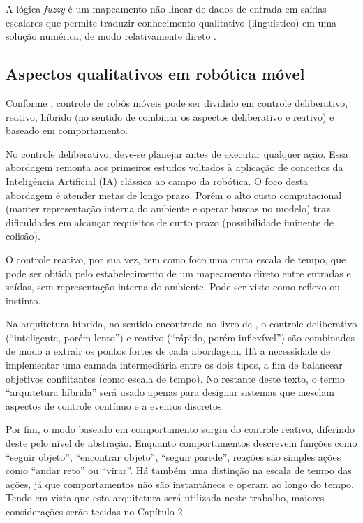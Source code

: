 A lógica \textit{fuzzy} é um mapeamento não linear de dados de entrada em saídas
escalares que permite traduzir conhecimento qualitativo (linguístico) em uma
solução numérica, de modo relativamente direto \cite{Art_Mendel}. 

\subsection{Aspectos qualitativos em robótica móvel}

Conforme , controle de robôs móveis pode ser
dividido em controle deliberativo, reativo, híbrido (no sentido de
combinar os aspectos deliberativo e reativo) e baseado em comportamento.

No controle deliberativo, deve-se planejar antes de executar qualquer
ação. Essa abordagem remonta aos primeiros estudos voltados à aplicação de
conceitos da Inteligência Artificial (IA) clássica ao campo da robótica. O foco
desta abordagem é atender metas de longo prazo. Porém o alto custo computacional (manter representação
interna do ambiente e operar buscas no modelo) traz dificuldades em alcançar
requisitos de curto prazo (possibilidade iminente de colisão).

O controle reativo, por sua vez, tem como foco uma curta escala de tempo, que
pode ser obtida pelo estabelecimento de um mapeamento direto entre entradas e
saídas, sem representação interna do ambiente. Pode ser visto como reflexo ou
instinto. 

Na arquitetura híbrida, no sentido encontrado no livro de
, o controle deliberativo (``inteligente, porém
lento'') e reativo (``rápido, porém inflexível'') são combinados de modo a
extrair os pontos fortes de cada abordagem. Há a necessidade de implementar uma
camada intermediária entre os dois tipos, a fim de balancear objetivos
conflitantes (como escala de tempo). No restante deste texto, o termo
``arquitetura híbrida'' será usado apenas para designar sistemas que mesclam
aspectos de controle contínuo e a eventos discretos.  

Por fim, o modo baseado em comportamento surgiu do controle reativo, diferindo
deste pelo nível de abstração. Enquanto comportamentos descrevem funções como
``seguir objeto'', ``encontrar objeto'', ``seguir parede'', reações são simples
ações como ``andar reto'' ou ``virar''. Há também uma distinção na escala de
tempo das ações, já que comportamentos não são instantâneos e operam ao longo do
tempo. Tendo em vista que esta arquitetura será utilizada neste trabalho,
maiores considerações serão tecidas no Capítulo 2.

